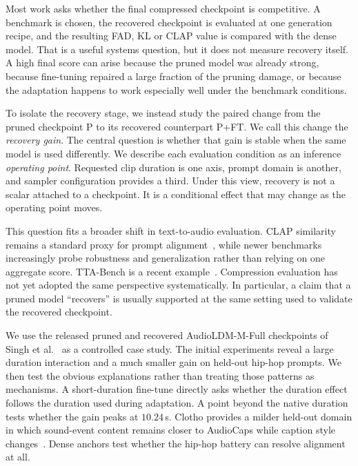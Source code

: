 \documentclass{article}
\newcommand{\PFT}{P{+}FT}
\begin{document}
Most work asks whether the final compressed checkpoint is competitive. A benchmark is chosen, the recovered checkpoint is evaluated at one generation recipe, and the resulting FAD, KL or CLAP value is compared with the dense model. That is a useful systems question, but it does not measure recovery itself. A high final score can arise because the pruned model was already strong, because fine-tuning repaired a large fraction of the pruning damage, or because the adaptation happens to work especially well under the benchmark conditions.

To isolate the recovery stage, we instead study the paired change from the pruned checkpoint P to its recovered counterpart \PFT{}. We call this change the \emph{recovery gain}. The central question is whether that gain is stable when the same model is used differently. We describe each evaluation condition as an inference \emph{operating point}. Requested clip duration is one axis, prompt domain is another, and sampler configuration provides a third. Under this view, recovery is not a scalar attached to a checkpoint. It is a conditional effect that may change as the operating point moves.

This question fits a broader shift in text-to-audio evaluation. CLAP similarity remains a standard proxy for prompt alignment~\cite{wu2023clap,huang2023makeanaudio,ghosal2023tango}, while newer benchmarks increasingly probe robustness and generalization rather than relying on one aggregate score. TTA-Bench is a recent example~\cite{wang2026ttabench}. Compression evaluation has not yet adopted the same perspective systematically. In particular, a claim that a pruned model ``recovers'' is usually supported at the same setting used to validate the recovered checkpoint.

We use the released pruned and recovered AudioLDM-M-Full checkpoints of Singh et al.~\cite{singh2026pruning} as a controlled case study. The initial experiments reveal a large duration interaction and a much smaller gain on held-out hip-hop prompts. We then test the obvious explanations rather than treating those patterns as mechanisms. A short-duration fine-tune directly asks whether the duration effect follows the duration used during adaptation. A point beyond the native duration tests whether the gain peaks at $10.24$\,s. Clotho provides a milder held-out domain in which sound-event content remains closer to AudioCaps while caption style changes~\cite{drossos2020clotho}. Dense anchors test whether the hip-hop battery can resolve alignment at all.
\end{document}
